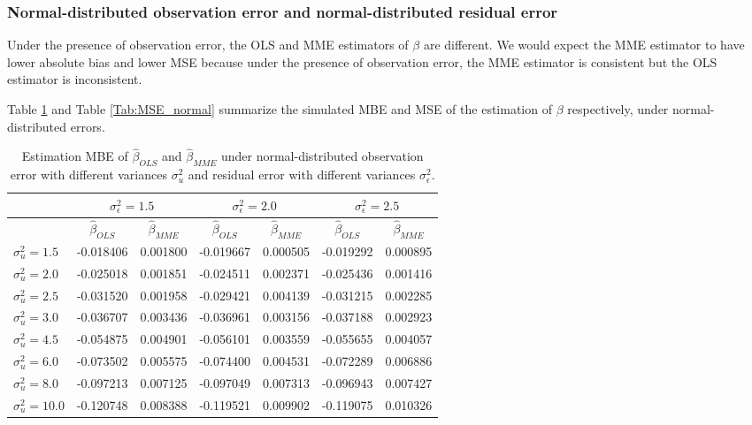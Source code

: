 \documentclass{article}
\begin{document}
\subsubsection{Normal-distributed observation error and normal-distributed residual error}

Under the presence of observation error, the OLS and MME estimators of $\beta$ are different.
We would expect the MME estimator to have lower absolute bias and lower MSE because under the presence of observation error, the MME estimator is consistent but the OLS estimator is inconsistent.

Table \ref{Tab:MBE_normal} and Table \ref{Tab:MSE_normal} summarize the simulated MBE and MSE of the estimation of $\beta$ respectively, under normal-distributed errors.

\begin{table}[ht]
    \centering
    \caption{Estimation MBE of $\hat{\beta}_{OLS}$ and $\hat{\beta}_{MME}$ under normal-distributed observation error with different variances $\sigma^2_u$ and residual error with different variances $\sigma^2_\epsilon$.}
    \label{Tab:MBE_normal}
    \begin{tabular}[t]{lcccccc}
        \hline
        &\multicolumn{2}{c}{$\sigma^2_\epsilon=1.5$}&\multicolumn{2}{c}{$\sigma^2_\epsilon=2.0$}&\multicolumn{2}{c}{$\sigma^2_\epsilon=2.5$}\\
        \hline
        &$\hat{\beta}_{OLS}$&$\hat{\beta}_{MME}$&$\hat{\beta}_{OLS}$&$\hat{\beta}_{MME}$&$\hat{\beta}_{OLS}$&$\hat{\beta}_{MME}$\\
        \hline
        $\sigma^2_u = 1.5$&-0.018406&0.001800&-0.019667&0.000505&-0.019292&0.000895\\
        $\sigma^2_u = 2.0$&-0.025018&0.001851&-0.024511&0.002371&-0.025436&0.001416\\
        $\sigma^2_u = 2.5$&-0.031520&0.001958&-0.029421&0.004139&-0.031215&0.002285\\
        $\sigma^2_u = 3.0$&-0.036707&0.003436&-0.036961&0.003156&-0.037188&0.002923\\
        $\sigma^2_u = 4.5$&-0.054875&0.004901&-0.056101&0.003559&-0.055655&0.004057\\
        $\sigma^2_u = 6.0$&-0.073502&0.005575&-0.074400&0.004531&-0.072289&0.006886\\
        $\sigma^2_u = 8.0$&-0.097213&0.007125&-0.097049&0.007313&-0.096943&0.007427\\
        $\sigma^2_u = 10.0$&-0.120748&0.008388&-0.119521&0.009902&-0.119075&0.010326\\
        \hline
    \end{tabular}
\end{table}
\end{document}
